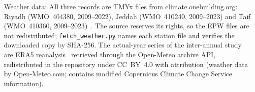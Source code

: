 \documentclass[3p,twocolumn,number]{elsarticle}
\begin{document}
Weather data: All three records are TMYx files from climate.onebuilding.org: Riyadh (WMO~404380, 2009--2022), Jeddah (WMO~410240, 2009--2023) and Taif (WMO~410360, 2009--2023)~\cite{EPW2023}. The source reserves its rights, so the EPW files are not redistributed; \texttt{fetch\_weather.py} names each station file and verifies the downloaded copy by SHA-256. The actual-year series of the inter-annual study are ERA5 reanalysis~\cite{Hersbach2020} retrieved through the Open-Meteo archive API, redistributed in the repository under CC~BY~4.0 with attribution (weather data by Open-Meteo.com; contains modified Copernicus Climate Change Service information).



\end{document}
